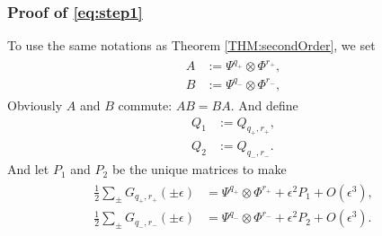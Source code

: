 \documentclass{article}
\numberwithin{equation}{section}
\begin{document}
\subsubsection{Proof of \eqref{eq:step1}}\label{subsub:step1}
To use the same notations as Theorem \ref{THM:secondOrder}, we set
\begin{align}\label{def:ABQ}
\begin{split}
    A&:=\Psi^{q_{+}}\otimes \Phi^{r_{+}},\\
    B&:=\Psi^{q_{-}}\otimes \Phi^{r_{-}},
\end{split}
\end{align} Obviously $A$ and $B$ commute: $AB=BA.$
And define
\begin{align*}
    Q_1&:=Q_{q_+,r_+},\\
    Q_2&:=Q_{q_-,r_-}.
\end{align*}
And let $P_1$ and $P_2$ be the unique matrices to make
\begin{align}\label{def:P1P2}
\begin{split}
    \frac{1}{2} \sum_{\pm}G_{q_+, r_+}(\pm\epsilon) &=\Psi^{q_{+}}\otimes \Phi^{r_{+}}+\epsilon^2 P_1+O(\epsilon^3),\\
    \frac{1}{2} \sum_{\pm}G_{q_-, r_-}(\pm\epsilon)&=\Psi^{q_{-}}\otimes \Phi^{r_{-}}+\epsilon^2 P_2+O(\epsilon^3).
\end{split}
\end{align}
\end{document}
